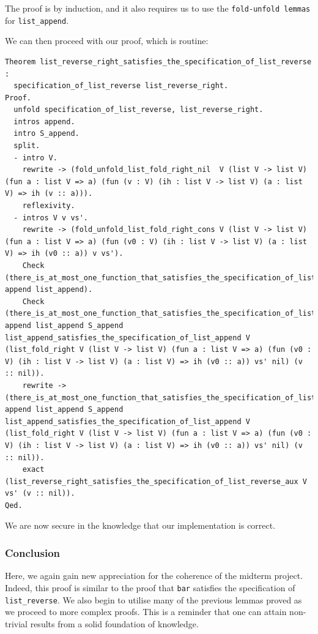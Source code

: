 \documentclass{article}
\begin{document}
The proof is by induction, and it also requires us to use the \texttt{fold-unfold lemmas} for \texttt{list\_append}.

We can then proceed with our proof, which is routine:

\begin{lstlisting}
Theorem list_reverse_right_satisfies_the_specification_of_list_reverse :
  specification_of_list_reverse list_reverse_right.
Proof.
  unfold specification_of_list_reverse, list_reverse_right.
  intros append.
  intro S_append.
  split.
  - intro V.
    rewrite -> (fold_unfold_list_fold_right_nil  V (list V -> list V) (fun a : list V => a) (fun (v : V) (ih : list V -> list V) (a : list V) => ih (v :: a))).
    reflexivity.
  - intros V v vs'.
    rewrite -> (fold_unfold_list_fold_right_cons V (list V -> list V) (fun a : list V => a) (fun (v0 : V) (ih : list V -> list V) (a : list V) => ih (v0 :: a)) v vs').
    Check (there_is_at_most_one_function_that_satisfies_the_specification_of_list_append append list_append).
    Check (there_is_at_most_one_function_that_satisfies_the_specification_of_list_append append list_append S_append list_append_satisfies_the_specification_of_list_append V (list_fold_right V (list V -> list V) (fun a : list V => a) (fun (v0 : V) (ih : list V -> list V) (a : list V) => ih (v0 :: a)) vs' nil) (v :: nil)).
    rewrite -> (there_is_at_most_one_function_that_satisfies_the_specification_of_list_append append list_append S_append list_append_satisfies_the_specification_of_list_append V (list_fold_right V (list V -> list V) (fun a : list V => a) (fun (v0 : V) (ih : list V -> list V) (a : list V) => ih (v0 :: a)) vs' nil) (v :: nil)).
    exact (list_reverse_right_satisfies_the_specification_of_list_reverse_aux V vs' (v :: nil)).
Qed.
\end{lstlisting}

We are now secure in the knowledge that our implementation is correct.

\subsubsection{Conclusion}
Here, we again gain new appreciation for the coherence of the midterm project. Indeed, this proof is similar to the proof that \texttt{bar} satisfies the specification of \texttt{list\_reverse}. We also begin to utilise many of the previous lemmas proved as we proceed to more complex proofs. This is a reminder that one can attain non-trivial results from a solid foundation of knowledge.
\end{document}
